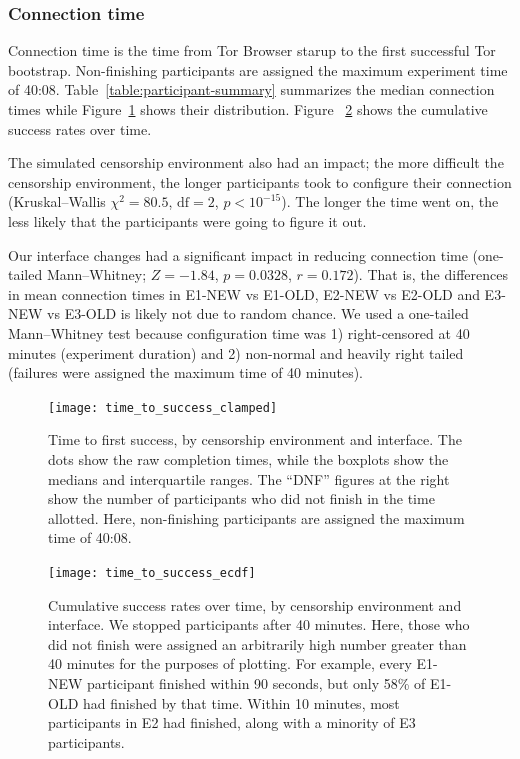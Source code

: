 \documentclass[USenglish,oneside,twocolumn]{article}
\begin{document}
\subsubsection{Connection time} 
{\color {blue} 
Connection time is the time from Tor Browser starup to the first successful Tor bootstrap. Non-finishing participants are assigned the maximum experiment time of 40:08. Table~\ref{table:participant-summary} summarizes the median connection times while Figure~\ref{fig:time_to_success_clamped} shows their distribution. Figure ~\ref{fig:time_to_success_ecdf} shows the cumulative success rates over time. 

The simulated censorship environment also had an impact; the more difficult the censorship environment, the longer participants took to configure their connection (Kruskal--Wallis $\chi^2 = 80.5$, $\mbox{df} = 2$, $p < 10^{-15}$). 
The longer the time went on, the less likely that the participants were going to figure it out. 

Our interface changes had a significant impact in reducing connection time (one-tailed Mann--Whitney; $ Z = -1.84$, $p = 0.0328$, $r= 0.172$). That is, the differences in mean connection times in E1-NEW vs E1-OLD, E2-NEW vs E2-OLD and E3-NEW vs E3-OLD is likely not due to random chance. We used a one-tailed Mann--Whitney test because configuration time was 1) right-censored at 40 minutes (experiment duration) and 2) non-normal and heavily right tailed (failures were assigned the maximum time of 40 minutes). 
}

\begin{figure}[t]
\centering
\texttt{[image: time\_to\_success\_clamped]}
\caption{
Time to first success, by censorship environment and interface.
The dots show the raw completion times,
while the boxplots show the medians and interquartile ranges.
The ``DNF'' figures at the right show the number of participants 
who did not finish in the time allotted.
Here, non-finishing participants are assigned the maximum time of 40:08.
}
\label{fig:time_to_success_clamped}
\end{figure}

\begin{figure}[t]
\centering
\texttt{[image: time\_to\_success\_ecdf]}

\caption{
Cumulative success rates over time, by censorship environment and interface.
We stopped participants after 40 minutes. Here, those who did not finish were assigned
an arbitrarily high number greater than 40 minutes for the purposes of plotting. 
For example, every E1-NEW participant finished within 90 seconds,
but only 58\% of E1-OLD had finished by that time. Within 10 minutes, most
participants in E2 had finished, along with a minority of E3 participants. 
}
\label{fig:time_to_success_ecdf}
\end{figure}
\end{document}
